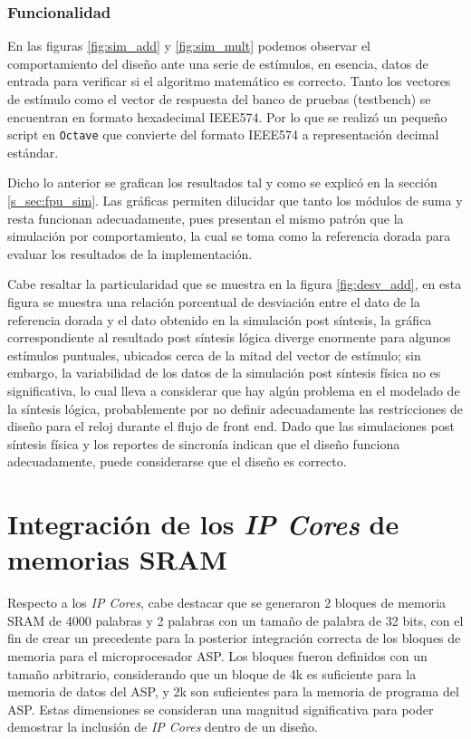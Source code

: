 \subsubsection{Funcionalidad}

En las figuras \ref{fig:sim_add} y \ref{fig:sim_mult} podemos observar el comportamiento del diseño ante una serie de estímulos, en esencia, datos de entrada para verificar si el algoritmo matemático es correcto. Tanto los vectores de estímulo como el vector de respuesta del banco de pruebas (testbench) se encuentran en formato hexadecimal IEEE574. Por lo que se realizó un pequeño script en \texttt{Octave} que convierte del formato IEEE574 a representación decimal estándar.

Dicho lo anterior se grafican los resultados tal y como se explicó en la sección \ref{s_sec:fpu_sim}. Las gráficas permiten dilucidar que tanto los módulos de suma y resta funcionan adecuadamente, pues presentan el mismo patrón que la simulación por comportamiento, la cual se toma como la referencia dorada para evaluar los resultados de la implementación. 

Cabe resaltar la particularidad que se muestra en la figura \ref{fig:desv_add}, en esta figura se muestra una relación porcentual de desviación entre el dato de la referencia dorada y el dato obtenido en la simulación post síntesis, la gráfica correspondiente al resultado post síntesis lógica diverge enormente para algunos estímulos puntuales, ubicados cerca de la mitad del vector de estímulo; sin embargo, la variabilidad de los datos de la simulación post síntesis física no es significativa, lo cual lleva a considerar que hay algún problema en el modelado de la síntesis lógica, probablemente por no definir adecuadamente las restricciones de diseño para el reloj durante el flujo de front end. Dado que las simulaciones post síntesis física y los reportes de sincronía indican que el diseño funciona adecuadamente, puede considerarse que el diseño es correcto.


\section{Integración de los \textit{IP Cores} de memorias SRAM}

Respecto a los \textit{IP Cores}, cabe destacar que se generaron 2 bloques de memoria SRAM de 4000 palabras y 2 palabras con un tamaño de palabra de 32 bits, con el fin de crear un precedente para la posterior integración correcta de los bloques de memoria para el microprocesador ASP. Los bloques fueron definidos con un tamaño arbitrario, considerando que un bloque de 4k es suficiente para la memoria de datos del ASP, y 2k son suficientes para la memoria de programa del ASP. Estas dimensiones se consideran una magnitud significativa para poder demostrar la inclusión de \textit{IP Cores} dentro de un diseño.

